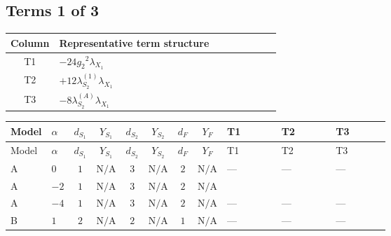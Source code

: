 \documentclass[8pt]{article}
\begin{document}
\begin{landscape}
\subsection*{Terms 1 of 3}
\begin{center}
\begin{tabular}{@{}c >{\raggedright\arraybackslash}p{0.82\linewidth}@{}}
\toprule
Column & Representative term structure \\
\midrule
T1 & \(\displaystyle -24 {g_2}^2 {\lambda_{X_{1}}}\) \\
\midrule
T2 & \(\displaystyle +12 {\lambda_{S_2}^{(1)}} {\lambda_{X_{1}}}\) \\
\midrule
T3 & \(\displaystyle -8 {\lambda_{S_2}^{(A)}} {\lambda_{X_{1}}}\) \\
\midrule
\bottomrule
\end{tabular}
\end{center}
\smallskip
\tiny
\begin{longtable}{@{}llcccccc >{\raggedright\arraybackslash}p{0.21\linewidth} >{\raggedright\arraybackslash}p{0.21\linewidth} >{\raggedright\arraybackslash}p{0.21\linewidth}@{}}
\toprule
Model & $\alpha$ & $d_{S_1}$ & $Y_{S_1}$ & $d_{S_2}$ & $Y_{S_2}$ & $d_F$ & $Y_F$ & T1 & T2 & T3 \\
\midrule
\endfirsthead
\toprule
Model & $\alpha$ & $d_{S_1}$ & $Y_{S_1}$ & $d_{S_2}$ & $Y_{S_2}$ & $d_F$ & $Y_F$ & T1 & T2 & T3 \\
\midrule
\endhead
A & $0$ & $1$ & $\text{N/A}$ & $3$ & $\text{N/A}$ & $2$ & $\text{N/A}$ & --- & --- & --- \\
\midrule
A & $-2$ & $1$ & $\text{N/A}$ & $3$ & $\text{N/A}$ & $2$ & $\text{N/A}$ & \scriptsize\adjustbox{max width=\linewidth}{$\begin{gathered} -24 {g_2}^2 {\lambda_{X_{1}}}\end{gathered}$} & \scriptsize\adjustbox{max width=\linewidth}{$\begin{gathered} +12 {\lambda_{S_2}^{(1)}} {\lambda_{X_{1}}}\end{gathered}$} & \scriptsize\adjustbox{max width=\linewidth}{$\begin{gathered} -8 {\lambda_{S_2}^{(A)}} {\lambda_{X_{1}}}\end{gathered}$} \\
\midrule
A & $-4$ & $1$ & $\text{N/A}$ & $3$ & $\text{N/A}$ & $2$ & $\text{N/A}$ & --- & --- & --- \\
\midrule
B & $1$ & $2$ & $\text{N/A}$ & $2$ & $\text{N/A}$ & $1$ & $\text{N/A}$ & --- & --- & --- \\

\end{longtable}
\end{landscape}
\end{document}
